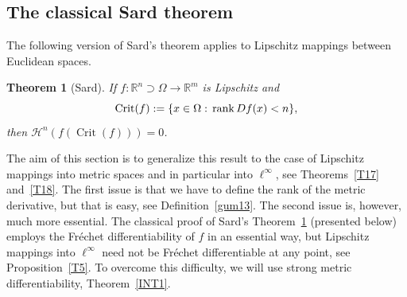 \documentclass[12pt,leqno]{amsart}
\newtheorem{theorem}{Theorem}
\theoremstyle{definition}
\newcommand{\bbbr}{\mathbb R}
\def\H{{\mathcal H}}
\def\rank{{\rm rank\,}}
\numberwithin{theorem}{section} \numberwithin{equation}{section}
\begin{document}
\subsection{The classical Sard theorem}
The following version of Sard’s theorem applies to Lipschitz mappings between Euclidean spaces.
\begin{theorem}[Sard]
\label{T15}
If $f:\bbbr^n\supset\Omega\to\bbbr^m$ is Lipschitz and
$$
\operatorname{Crit}(f):=\{x\in\Omega:\, \rank Df(x)<n\},
$$
then $\H^n(f(\operatorname{Crit}(f)))=0$.
\end{theorem}
The aim of this section is to generalize this result to the case of Lipschitz mappings into metric spaces and in particular into $\ell^\infty$, see Theorems~\ref{T17} and~\ref{T18}. The first issue is that we have to define the rank of the metric derivative, but that is easy, see Definition~\ref{gum13}.
The second issue is, however, much more essential. The classical proof of Sard's Theorem~\ref{T15} (presented below) employs the Fr\'echet differentiability of $f$ in an essential way, but Lipschitz mappings into $\ell^\infty$ need not be Fr\'echet differentiable at any point, see Proposition~\ref{T5}. To overcome this difficulty, we will use strong metric differentiability, Theorem~\ref{INT1}.
\end{document}
